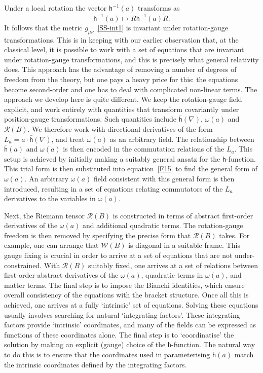\documentclass[a4paper]{article}
\numberwithin{equation}{section}
\newcommand{\dt}{\! \cdot \!}
\newcommand{\om}{\omega}
\newcommand{\clr}{{\mathcal{R}}}
\newcommand{\clw}{{\mathcal{W}}}
\newcommand{\Rrev}{\tilde{R}}
\newcommand{\lih}{\mathsf{h}}
\newcommand{\lbh}{\bar{\mathsf{h}}}
\newcommand{\ho}{\lbh}
\newcommand{\hu}{\lih}
\newcommand{\grad}{\nabla}
\begin{document}
Under a local rotation the vector $\hu^{-1}(a)$ transforms as
%
\begin{equation}
\hu^{-1}(a) \mapsto R \hu^{-1}(a) \Rrev.
\end{equation}
%
It follows that the metric $g_{\mu\nu}$~\eqref{SS-int1} is invariant
under rotation-gauge transformations.  This is in keeping with our
earlier observation that, at the classical level, it is possible to
work with a set of equations that are invariant under rotation-gauge
transformations, and this is precisely what general relativity does.
This approach has the advantage of removing a number of degrees of
freedom from the theory, but one pays a heavy price for this: the
equations become second-order and one has to deal with complicated
non-linear terms.  The approach we develop here is quite different.
We keep the rotation-gauge field explicit, and work entirely with
quantities that transform covariantly under position-gauge
transformations.  Such quantities include $\ho(\grad)$, $\om(a)$ and
$\clr(B)$.  We therefore work with directional derivatives of the form
$L_a=a\dt\ho(\grad)$, and treat $\om(a)$ as an arbitrary field.  The
relationship between $\ho(a)$ and $\om(a)$ is then encoded in the
commutation relations of the $L_a$.  This setup is achieved by
initially making a suitably general ansatz for the $\lih$-function.
This trial form is then substituted into equation~\eqref{F15} to find
the general form of $\om(a)$.  An arbitrary $\om(a)$ field consistent
with this general form is then introduced, resulting in a set of
equations relating commutators of the $L_a$ derivatives to the
variables in $\om(a)$.


Next, the Riemann tensor $\clr(B)$ is constructed in terms of abstract
first-order derivatives of the $\om(a)$ and additional quadratic
terms.  The rotation-gauge freedom is then removed by specifying the
precise form that $\clr(B)$ takes.  For example, one can arrange that
$\clw(B)$ is diagonal in a suitable frame.  This gauge fixing is
crucial in order to arrive at a set of equations that are not
under-constrained.  With $\clr(B)$ suitably fixed, one arrives at a
set of relations between first-order abstract derivatives of the
$\om(a)$, quadratic terms in $\om(a)$, and matter terms.  The final
step is to impose the Bianchi identities, which ensure overall
consistency of the equations with the bracket structure.  Once all
this is achieved, one arrives at a fully `intrinsic' set of equations.
Solving these equations usually involves searching for natural
`integrating factors'.  These integrating factors provide `intrinsic'
coordinates, and many of the fields can be expressed as functions of
these coordinates alone.  The final step is to `coordinatise' the
solution by making an explicit (gauge) choice of the $\lih$-function.
The natural way to do this is to ensure that the coordinates used in
parameterising $\ho(a)$ match the intrinsic coordinates defined by the
integrating factors.
\end{document}
